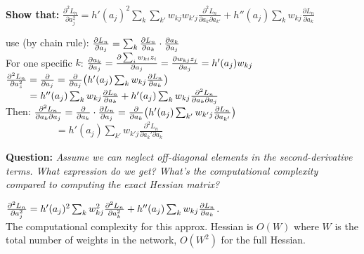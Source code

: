 \textbf{Show that:} $\frac{\partial^2 L_n}{\partial a_j^2}=h'(a_j)^2\sum\limits_k\sum\limits_{k'} w_{kj}w_{k'j}\frac{\partial^2 L_n}{\partial a_k \partial a_{k'}}+h''(a_j)\sum\limits_k w_{kj}\frac{\partial L_n}{\partial a_k}$

\tab use (by chain rule): $\pdv{L_n}{a_j} = \sum_k \pdv{L_n}{a_k} \cdot \pdv{a_k}{a_j}$\\
\tab For one specific $k$: $\pdv{a_k}{a_j} = \pdv{\sum_i w_{ki} z_i}{a_j} = \pdv{w_{kj} z_j}{a_j} = h'(a_j) w_{kj}$\\

\tab$\pdv[2]{L_n}{a_z} = \pdv{}{a_j} ( \pdv{L_n}{a_j} ) = \pdv{}{a_j} \bigr( h'(a_j) \sum_k w_{kj} \pdv{L_n}{a_k} \bigr) $\\
\tab$\phantom{\pdv[2]{L_n}{a_z} } = h''(a_j) \sum_k w_{kj} \pdv{L_n}{a_k}+h'(a_j) \sum_k w_{kj} \frac{\partial^2 L_n}{\partial a_k \partial a_j}$\\

Then: $\frac{\partial^2 L_n}{\partial a_k \partial a_j}= \pdv{}{a_k} \cdot \pdv{L_n}{a_j} = \pdv{}{a_k} \bigr(h'(a_j) \sum_{k'} w_{k'j} \pdv{L_n}{a_{k'}} \bigr)$\\

$\phantom{\text{Then: }\frac{\partial^2 L_n}{\partial a_k \partial a_j}}=h'(a_j)\sum_{k'} w_{k'j} \frac{\partial^2 L_n}{\partial a_k' \partial a_k}$

\textbf{Question:} \emph{Assume we can neglect off-diagonal elements in the second-derivative terms. What expression do we get? What's the computational complexity compared to computing the exact Hessian matrix?}

\tab$\pdv[2]{L_n}{a_j} = h'(a_j)^2 \sum_k w^2_{kj} \pdv[2]{L_n}{a_k} + h''(a_j) \sum_k w_{kj} \pdv{L_n}{a_k}$.\\

\tab The computational complexity for this approx. Hessian is $O(W)$ where $W$ is the total number of weights in the network, $O(W^2)$ for the full Hessian.

